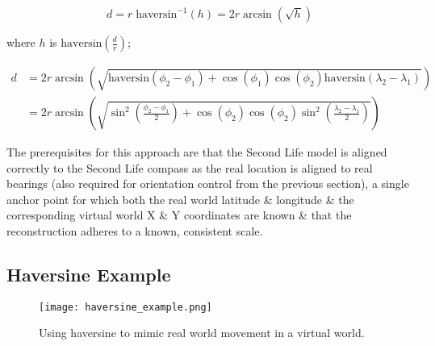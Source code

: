 \begin{equation}
	\label{haversine3}
	d = r\;\text{haversin}^{-1}\left( h \right) = 2r \arcsin \left( \sqrt{h} \right)
\end{equation}

where $h$ is $\text{haversin}\left( \frac{d}{r} \right)$;

\begin{align}
d & = 2r \arcsin\left( \sqrt{\text{haversin} \left( \phi_{2} - \phi_{1} \right) + \cos \left( \phi_{1} \right) \cos  \left( \phi_{2} \right) \text{haversin} \left( \lambda_{2} - \lambda_{1} \right) } \right) \nonumber \\ 
& = 2r \arcsin\left( \sqrt{\sin^{2} \left( \frac{\phi_{2} - \phi_{1}}{2}\right) + \cos\left( \phi_{2} \right) \cos\left( \phi_{2} \right) \sin^{2} \left( \frac{\lambda_{2} - \lambda_{1}}{2} \right) } \right)
\end{align}

The prerequisites for this approach are that the Second Life model is aligned correctly to the Second Life compass as the real location is aligned to real bearings (also required for orientation control from the previous section), a single anchor point for which both the real world latitude \& longitude \& the corresponding virtual world X \& Y coordinates are known \& that the reconstruction adheres to a known, consistent scale.

\subsection{Haversine Example}

\begin{figure}[h]
\centering
  \texttt{[image: haversine\_example.png]}
  \caption{Using haversine to mimic real world movement in a virtual world.}
  \label{haversine_example.png}
\end{figure}



